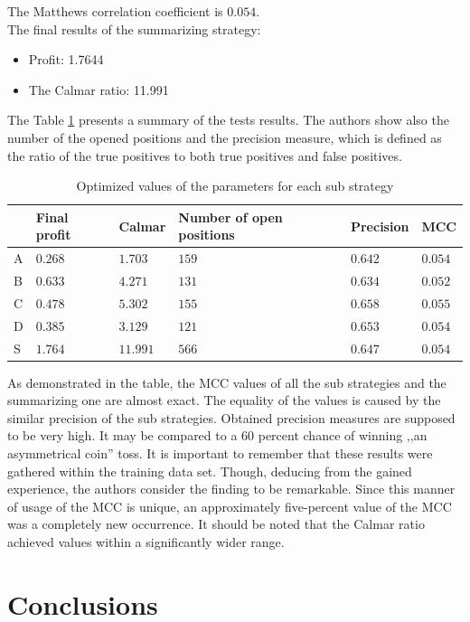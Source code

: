 \documentclass{jtacs}
\begin{document}
\noindent The Matthews correlation coefficient is $0.054$.\\
The final results of the summarizing strategy:
\begin{itemize}
\item Profit: 1.7644
\item The Calmar ratio: 11.991
\end{itemize}
\vspace{1em}
The Table \ref{tab13} presents a summary of the tests results. The authors show also the number of the opened positions and the precision measure, which  is defined as the ratio of the true positives to both true positives and false positives. 
\begin{table}[ht]
\centering
\caption{Optimized values of the parameters for each sub strategy}
\label{tab13}
\begin{tabular}{|l|l|l|l|l|l|}\hline
&	Final profit &	Calmar	& Number of open positions	& Precision & 	MCC \\ \hline
A	& $0.268$	& $1.703$	& $159$	& $0.642$	& $0.054$\\ \hline
B	& $0.633$	& $4.271$	& $131$	& $0.634$	& $0.052$\\ \hline
C	& $0.478$	& $5.302$	& $155$	& $0.658$	& $0.055$\\ \hline
D	& $0.385$	& $3.129$	& $121$	& $0.653$	& $0.054$\\ \hline
S	& $1.764$	& $11.991$	& $566$	& $0.647$	& $0.054$\\ \hline
\end{tabular}
\end{table}
\FloatBarrier
As demonstrated in the table, the MCC values of all the sub strategies and the summarizing one are almost exact. The equality of the values is caused by the similar precision of the sub strategies. Obtained precision measures are supposed to be very high. It may be compared to a 60 percent chance of winning ,,an asymmetrical coin'' toss. It is important to remember that these results were gathered within the training data set. Though, deducing from the gained experience, the authors consider the finding to be remarkable. Since this manner of usage of the MCC is unique, an approximately five-percent value of the MCC was a completely new occurrence. It should be noted that the Calmar ratio achieved values within a significantly wider range. 	
	
\section{Conclusions}
\end{document}
